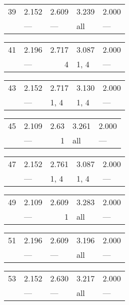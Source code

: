 \begin{tabular}{lllll}
\toprule
 39 & 2.152 & 2.609 & 3.239 & 2.000 \\
    & ---   & ---   & all   & ---   \\
\bottomrule
\end{tabular}
\begin{tabular}{llrll}
\toprule
 41 & 2.196 & 2.717 & 3.087 & 2.000 \\
    & ---   & 4     & 1, 4  & ---   \\
\bottomrule
\end{tabular}
\begin{tabular}{lllll}
\toprule
 43 & 2.152 & 2.717 & 3.130 & 2.000 \\
    & ---   & 1, 4  & 1, 4  & ---   \\
\bottomrule
\end{tabular}
\begin{tabular}{llrll}
\toprule
 45 & 2.109 & 2.63 & 3.261 & 2.000 \\
    & ---   & 1    & all   & ---   \\
\bottomrule
\end{tabular}
\begin{tabular}{lllll}
\toprule
 47 & 2.152 & 2.761 & 3.087 & 2.000 \\
    & ---   & 1, 4  & 1, 4  & ---   \\
\bottomrule
\end{tabular}
\begin{tabular}{llrll}
\toprule
 49 & 2.109 & 2.609 & 3.283 & 2.000 \\
    & ---   & 1     & all   & ---   \\
\bottomrule
\end{tabular}
\begin{tabular}{lllll}
\toprule
 51 & 2.196 & 2.609 & 3.196 & 2.000 \\
    & ---   & ---   & all   & ---   \\
\bottomrule
\end{tabular}
\begin{tabular}{lllll}
\toprule
 53 & 2.152 & 2.630 & 3.217 & 2.000 \\
    & ---   & ---   & all   & ---   \\
\bottomrule
\end{tabular}
